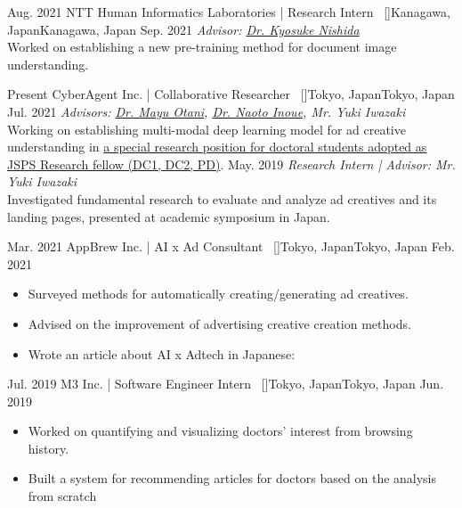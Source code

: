 
\begin{experiences}
\researchexperience
    {Aug. 2021}   {NTT Human Informatics Laboratories | Research Intern{\normalfont  ~ [\href{https://www.rd.ntt/e/hil/}{\small{\websiteSymbol}}]}}{Kanagawa, Japan}{Kanagawa, Japan}
    {Sep. 2021} {\textit{Advisor: \href{https://www.knishida.info/}{Dr. Kyosuke Nishida}}\\
    Worked on establishing a new pre-training method for document image understanding.
    }

\emptySeparator
\researchexperience
    {Present}   {CyberAgent Inc. | Collaborative Researcher{\normalfont  ~ [\href{https://www.cyberagent.co.jp/news/detail/id=26231}{\small{\websiteSymbol}}]}}{Tokyo, Japan}{Tokyo, Japan}
    {Jul. 2021} {\textit{Advisors: \href{https://mayu-ot.github.io/}{Dr. Mayu Otani}, \href{https://naoto0804.github.io/}{Dr. Naoto Inoue}, {Mr. Yuki Iwazaki}}\\
    Working on establishing multi-modal deep learning model for ad creative understanding in \href{https://www.cyberagent.co.jp/news/detail/id=26231}{a special research position for doctoral students adopted as JSPS Research fellow (DC1, DC2, PD)}.
    \vskip 0.1cm
    }
\researchexperience
    {}   {}{}{}
    {May. 2019} {\textit{Research Intern | Advisor: {Mr. Yuki Iwazaki}}\\
    Investigated fundamental research to evaluate and analyze ad creatives and its landing pages, presented at academic symposium in Japan.
    }

\emptySeparator
\researchexperience
    {Mar. 2021}   {AppBrew Inc. | AI x Ad Consultant{\normalfont  ~ [\href{https://appbrew.io/}{\small{\websiteSymbol}}]}}{Tokyo, Japan}{Tokyo, Japan}
    {Feb. 2021} {
        \begin{itemize}
            \item Surveyed methods for automatically creating/generating ad creatives. 
            \item Advised on the improvement of advertising creative creation methods. 
            \item Wrote an article about AI x Adtech in Japanese:
        \end{itemize}
    }

\emptySeparator
\researchexperience
    {Jul. 2019}   {M3 Inc. | Software Engineer Intern{\normalfont  ~ [\href{https://corporate.m3.com/en/}{\small{\websiteSymbol}}]}}{Tokyo, Japan}{Tokyo, Japan}
    {Jun. 2019} {
        \begin{itemize}
            \item Worked on quantifying and visualizing doctors' interest from browsing history.
            \item Built a system for recommending articles for doctors based on the analysis from scratch
        \end{itemize}
    }


\end{experiences}
